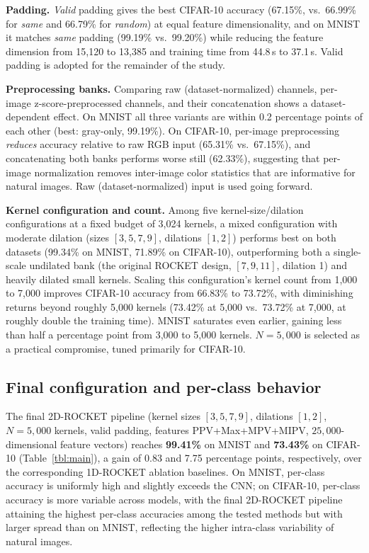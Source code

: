 \documentclass[a4paper,fleqn]{cas-sc}
\begin{document}
\textbf{Padding.} \emph{Valid} padding gives the best CIFAR-10 accuracy (67.15\%, vs.\ 66.99\% for \emph{same} and 66.79\% for \emph{random}) at equal feature dimensionality, and on MNIST it matches \emph{same} padding (99.19\% vs.\ 99.20\%) while reducing the feature dimension from 15{,}120 to 13{,}385 and training time from 44.8\,s to 37.1\,s. Valid padding is adopted for the remainder of the study.

\textbf{Preprocessing banks.} Comparing raw (dataset-normalized) channels, per-image z-score-preprocessed channels, and their concatenation shows a dataset-dependent effect. On MNIST all three variants are within 0.2 percentage points of each other (best: gray-only, 99.19\%). On CIFAR-10, per-image preprocessing \emph{reduces} accuracy relative to raw RGB input (65.31\% vs.\ 67.15\%), and concatenating both banks performs worse still (62.33\%), suggesting that per-image normalization removes inter-image color statistics that are informative for natural images. Raw (dataset-normalized) input is used going forward.

\textbf{Kernel configuration and count.} Among five kernel-size/dilation configurations at a fixed budget of 3{,}024 kernels, a mixed configuration with moderate dilation (sizes $[3,5,7,9]$, dilations $[1,2]$) performs best on both datasets (99.34\% on MNIST, 71.89\% on CIFAR-10), outperforming both a single-scale undilated bank (the original ROCKET design, $[7,9,11]$, dilation 1) and heavily dilated small kernels. Scaling this configuration's kernel count from 1{,}000 to 7{,}000 improves CIFAR-10 accuracy from 66.83\% to 73.72\%, with diminishing returns beyond roughly 5{,}000 kernels (73.42\% at 5{,}000 vs.\ 73.72\% at 7{,}000, at roughly double the training time). MNIST saturates even earlier, gaining less than half a percentage point from 3{,}000 to 5{,}000 kernels. $N=5{,}000$ is selected as a practical compromise, tuned primarily for CIFAR-10.

\subsection{Final configuration and per-class behavior}
The final 2D-ROCKET pipeline (kernel sizes $[3,5,7,9]$, dilations $[1,2]$, $N=5{,}000$ kernels, valid padding, features PPV+Max+MPV+MIPV, $25{,}000$-dimensional feature vectors) reaches \textbf{99.41\%} on MNIST and \textbf{73.43\%} on CIFAR-10 (Table~\ref{tbl:main}), a gain of 0.83 and 7.75 percentage points, respectively, over the corresponding 1D-ROCKET ablation baselines. On MNIST, per-class accuracy is uniformly high and slightly exceeds the CNN; on CIFAR-10, per-class accuracy is more variable across models, with the final 2D-ROCKET pipeline attaining the highest per-class accuracies among the tested methods but with larger spread than on MNIST, reflecting the higher intra-class variability of natural images.
\end{document}
